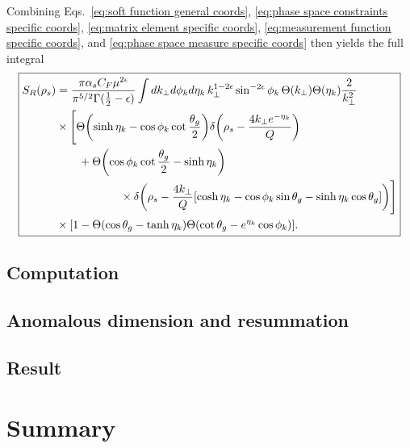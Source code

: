 \documentclass[12pt,twoside,class=../reedthesis, crop=false]{standalone}
\begin{document}
	Combining Eqs.~\ref{eq:soft function general coords}, \ref{eq:phase space constraints specific coords}, \ref{eq:matrix element specific coords}, \ref{eq:measurement function specific coords}, and \ref{eq:phase space measure specific coords} then yields the full integral
	\begin{equation}\label{eq:soft function specific coords}
	\boxed{
	\begin{aligned}
		S_R(\rho_s) &= \frac{\pi \alpha_s C_F \mu^{2\epsilon}}{\pi^{5/2} \Gamma(\frac{1}{2} - \epsilon)} \int dk_\perp d\phi_k d\eta_k \,k_\perp^{1 - 2\epsilon} \sin^{-2\epsilon} \phi_k \, \Theta(k_\perp)\Theta(\eta_k) \frac{2}{k_\perp^2} \\
		&\times \Bigg[ \Theta\qty(\sinh\eta_k - \cos\phi_k \cot\frac{\theta_g}{2}) \delta\qty(\rho_s - \frac{4k_\perp e^{-\eta_k}}{Q}) \\
		&\qquad+ \Theta\qty(\cos\phi_k \cot\frac{\theta_g}{2} - \sinh\eta_k) \\
		&\hspace{2cm}\times \delta\qty(\rho_s - \frac{4k_\perp}{Q}\qty[\cosh\eta_k - \cos\phi_k \sin\theta_g - \sinh\eta_k \cos\theta_g]) \Bigg] \\
		&\times \qty[1 - \Theta(\cos\theta_g - \tanh \eta_k)\Theta(\cot\theta_g - e^{\eta_k}\cos\phi_k)].
	\end{aligned}
	}
	\end{equation}

\subsection{Computation}

\subsection{Anomalous dimension and resummation}

\subsection{Result}

\section{Summary}


\ifstandalone
 

\fi
\end{document}

